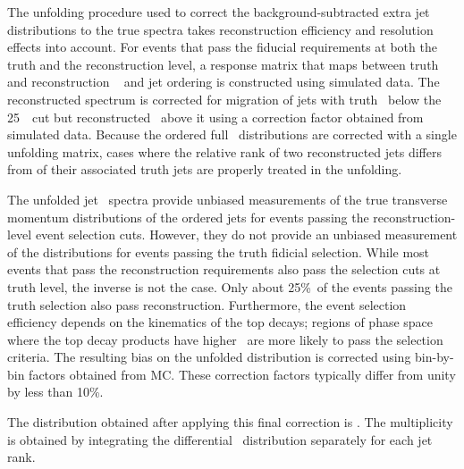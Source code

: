 The unfolding procedure used to correct the background-subtracted extra jet \pt~  distributions to the true
spectra takes  reconstruction efficiency and resolution effects
into account.  For events that pass the fiducial requirements at both the truth and the reconstruction level,
a response matrix that maps between truth and reconstruction \pt~ and jet ordering is constructed using simulated data.  The reconstructed spectrum is corrected for migration
of jets with truth \pT\ below the 25~\GeV\ cut but reconstructed \pT\ above it using
a correction factor obtained from simulated data. 
Because the ordered full \pT\  distributions
are corrected with a single unfolding matrix, cases where the relative rank of two reconstructed jets
differs from of their associated truth jets are properly treated in the unfolding.  


The unfolded jet \pT\ spectra provide unbiased measurements of the true transverse momentum distributions of the ordered
jets for events passing the reconstruction-level event selection cuts.   However, they do 
not provide an unbiased measurement of the distributions for events passing the truth fidicial selection.
While most events that pass the reconstruction requirements
also pass the selection cuts at truth level, the inverse is not the case. Only about 25\%\ of the events
passing the truth selection also pass reconstruction.  Furthermore, the event selection efficiency
depends on the kinematics of the top decays;  regions of phase space where the top decay
products have higher \pT\ are more likely to pass the selection criteria.  The resulting bias on
the unfolded distribution is corrected  using bin-by-bin  factors obtained from MC.  
These correction factors typically differ from unity by less than 10\%.


The distribution obtained
after applying this final correction is \sigmapti.  The multiplicity
is obtained by integrating the differential \pT\ distribution separately for each jet rank.



